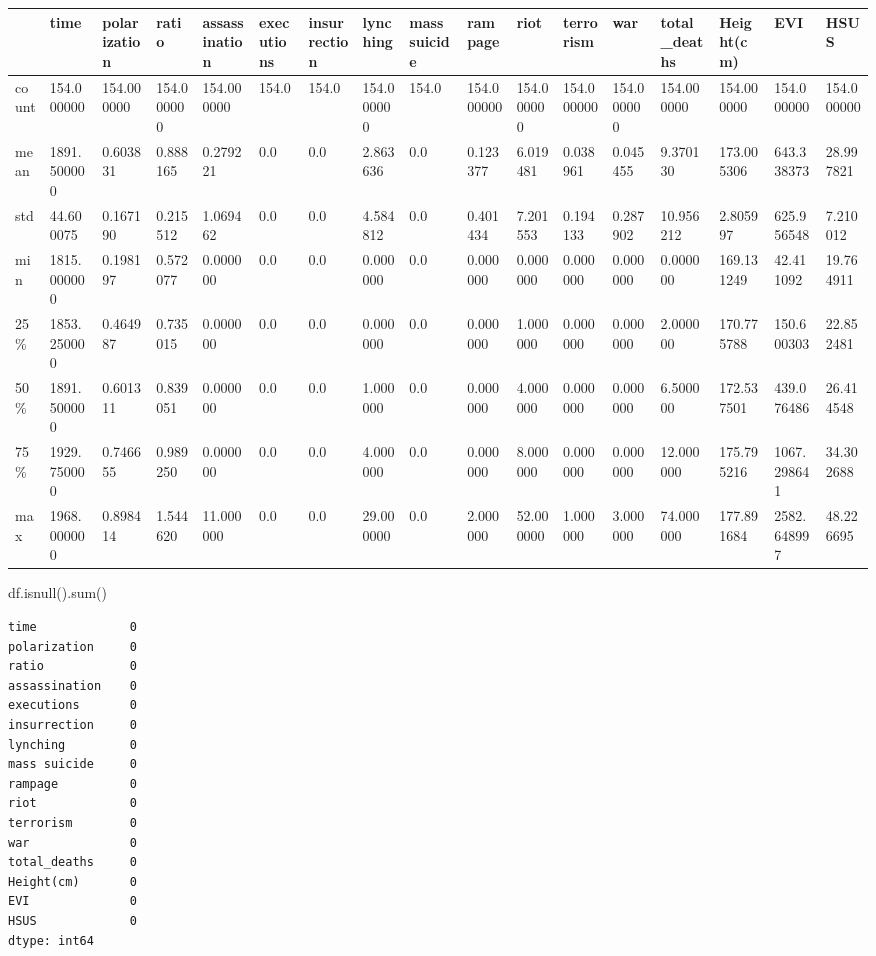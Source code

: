 \documentclass[
  letterpaper,
  DIV=11,
  numbers=noendperiod]{scrartcl}
\newenvironment{Shaded}{\begin{snugshade}}{\end{snugshade}}
\newcommand{\BuiltInTok}[1]{\textcolor[rgb]{0.00,0.23,0.31}{#1}}
\newcommand{\NormalTok}[1]{\textcolor[rgb]{0.00,0.23,0.31}{#1}}
\begin{document}
\begin{longtable}[]{@{}lllllllllllllllll@{}}
\toprule\noalign{}
& time & polarization & ratio & assassination & executions &
insurrection & lynching & mass suicide & rampage & riot & terrorism &
war & total\_deaths & Height(cm) & EVI & HSUS \\
\midrule\noalign{}
\endhead
\bottomrule\noalign{}
\endlastfoot
count & 154.000000 & 154.000000 & 154.000000 & 154.000000 & 154.0 &
154.0 & 154.000000 & 154.0 & 154.000000 & 154.000000 & 154.000000 &
154.000000 & 154.000000 & 154.000000 & 154.000000 & 154.000000 \\
mean & 1891.500000 & 0.603831 & 0.888165 & 0.279221 & 0.0 & 0.0 &
2.863636 & 0.0 & 0.123377 & 6.019481 & 0.038961 & 0.045455 & 9.370130 &
173.005306 & 643.338373 & 28.997821 \\
std & 44.600075 & 0.167190 & 0.215512 & 1.069462 & 0.0 & 0.0 & 4.584812
& 0.0 & 0.401434 & 7.201553 & 0.194133 & 0.287902 & 10.956212 & 2.805997
& 625.956548 & 7.210012 \\
min & 1815.000000 & 0.198197 & 0.572077 & 0.000000 & 0.0 & 0.0 &
0.000000 & 0.0 & 0.000000 & 0.000000 & 0.000000 & 0.000000 & 0.000000 &
169.131249 & 42.411092 & 19.764911 \\
25\% & 1853.250000 & 0.464987 & 0.735015 & 0.000000 & 0.0 & 0.0 &
0.000000 & 0.0 & 0.000000 & 1.000000 & 0.000000 & 0.000000 & 2.000000 &
170.775788 & 150.600303 & 22.852481 \\
50\% & 1891.500000 & 0.601311 & 0.839051 & 0.000000 & 0.0 & 0.0 &
1.000000 & 0.0 & 0.000000 & 4.000000 & 0.000000 & 0.000000 & 6.500000 &
172.537501 & 439.076486 & 26.414548 \\
75\% & 1929.750000 & 0.746655 & 0.989250 & 0.000000 & 0.0 & 0.0 &
4.000000 & 0.0 & 0.000000 & 8.000000 & 0.000000 & 0.000000 & 12.000000 &
175.795216 & 1067.298641 & 34.302688 \\
max & 1968.000000 & 0.898414 & 1.544620 & 11.000000 & 0.0 & 0.0 &
29.000000 & 0.0 & 2.000000 & 52.000000 & 1.000000 & 3.000000 & 74.000000
& 177.891684 & 2582.648997 & 48.226695 \\
\end{longtable}

\begin{Shaded}
\begin{Highlighting}[]
\NormalTok{df.isnull().}\BuiltInTok{sum}\NormalTok{()}
\end{Highlighting}
\end{Shaded}

\begin{verbatim}
time             0
polarization     0
ratio            0
assassination    0
executions       0
insurrection     0
lynching         0
mass suicide     0
rampage          0
riot             0
terrorism        0
war              0
total_deaths     0
Height(cm)       0
EVI              0
HSUS             0
dtype: int64
\end{verbatim}
\end{document}

